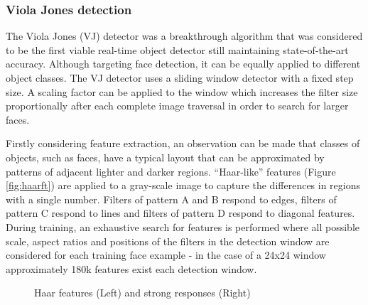 \documentclass[a4paper,twoside,12pt]{report}
\begin{document}
\subsubsection{Viola Jones detection}

The Viola Jones (VJ) detector \cite{vjdet} was a breakthrough algorithm that was considered to be the first viable real-time object detector still maintaining state-of-the-art accuracy. Although targeting face detection, it can be equally applied to different object classes. The VJ detector uses a sliding window detector with a fixed step size. A scaling factor can be applied to the window which increases the filter size proportionally after each complete image traversal in order to search for larger faces. 

Firstly considering feature extraction, an observation can be made that classes of objects, such as faces, have a typical layout that can be approximated by patterns of adjacent lighter and darker regions. ``Haar-like'' features (Figure \ref{fig:haarft}) are applied to a gray-scale image to capture the differences in regions with a single number. Filters of pattern A and B respond to edges, filters of pattern C respond to lines and filters of pattern D respond to diagonal features. During training, an exhaustive search for features is performed where all possible scale, aspect ratios and positions of the filters in the detection window are considered for each training face example - in the case of a 24x24 window approximately 180k features exist each detection window. 

\begin{figure}[h!]
    \centering
    \qquad
    \caption{Haar features \cite{vjdet} (Left) and strong responses (Right)}
\end{figure}
\end{document}
